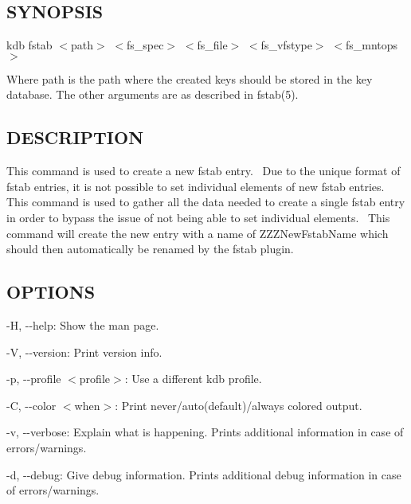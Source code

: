 \subsection*{S\+Y\+N\+O\+P\+S\+IS}

{\ttfamily kdb fstab $<$path$>$ $<$fs\+\_\+spec$>$ $<$fs\+\_\+file$>$ $<$fs\+\_\+vfstype$>$ $<$fs\+\_\+mntops$>$}

Where {\ttfamily path} is the path where the created keys should be stored in the key database. The other arguments are as described in fstab(5).

\subsection*{D\+E\+S\+C\+R\+I\+P\+T\+I\+ON}

This command is used to create a new {\ttfamily fstab} entry.~\newline
 Due to the unique format of {\ttfamily fstab} entries, it is not possible to set individual elements of new {\ttfamily fstab} entries.~\newline
 This command is used to gather all the data needed to create a single {\ttfamily fstab} entry in order to bypass the issue of not being able to set individual elements.~\newline
 This command will create the new entry with a name of {\ttfamily Z\+Z\+Z\+New\+Fstab\+Name} which should then automatically be renamed by the {\ttfamily fstab} plugin.~\newline


\subsection*{O\+P\+T\+I\+O\+NS}


\begin{DoxyItemize}
\item {\ttfamily -\/H}, {\ttfamily -\/-\/help}\+: Show the man page.
\item {\ttfamily -\/V}, {\ttfamily -\/-\/version}\+: Print version info.
\item {\ttfamily -\/p}, {\ttfamily -\/-\/profile $<$profile$>$}\+: Use a different kdb profile.
\item {\ttfamily -\/C}, {\ttfamily -\/-\/color $<$when$>$}\+: Print never/auto(default)/always colored output.
\item {\ttfamily -\/v}, {\ttfamily -\/-\/verbose}\+: Explain what is happening. Prints additional information in case of errors/warnings.
\item {\ttfamily -\/d}, {\ttfamily -\/-\/debug}\+: Give debug information. Prints additional debug information in case of errors/warnings.
\end{DoxyItemize}

